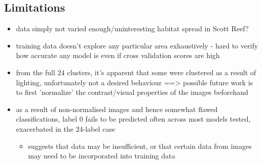 \subsection{Limitations}

\begin{itemize}
    \item data simply not varied enough/uninteresting habitat spread in Scott Reef?
    \item training data doesn't explore any particular area exhaustively - hard to verify how accurate any model is even if cross validation scores are high
    \item from the full 24 clusters, it's apparent that some were clustered as a result of lighting, unfortunately not a desired behaviour ==> possible future work is to first 'normalize' the contrast/visual properties of the images beforehand 
    \item as a result of non-normalised images and hence somewhat flawed classifications, label 0 fails to be predicted often across most models tested, exacerbated in the 24-label case
        \begin{itemize}
            \item suggests that data may be insufficient, or that certain data from images may need to be incorporated into training data
        \end{itemize}
\end{itemize}
